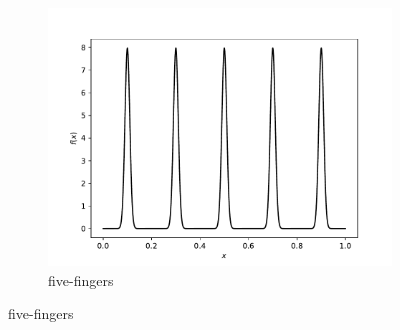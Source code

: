 \documentclass{article}
\begin{document}
\begin{figure}[htb]
\begin{subfigure}{0.333\textwidth}
  \includegraphics[width=\linewidth]{benchmark_distributions/five_fingers.pdf}
  \caption{five-fingers}
  \label{fig:five-fingers}
\end{subfigure}


\end{figure}
\end{document}
